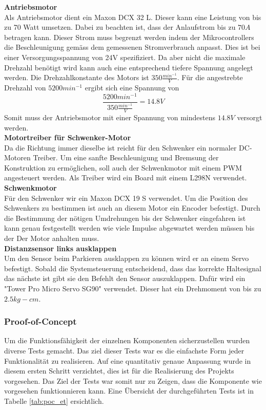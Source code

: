 \documentclass[../../main.tex]{subfiles}
\begin{document}
    \textbf{Antriebsmotor}\\
    Als Antriebsmotor dient ein Maxon DCX 32 L. Dieser kann eine Leistung von bis zu 70 Watt umsetzen. Dabei zu beachten ist, dass der Anlaufstrom bis zu $70A$ betragen kann. Dieser Strom muss begrenzt werden indem der Mikrocontrollers die Beschleunigung gemäss dem gemessenen Stromverbrauch anpasst.\cite{MaxonDCX32L} Dies ist bei einer Versorgungsspannung von 24V spezifiziert. Da aber nicht die maximale Drehzahl benötigt wird kann auch eine entsprechend tiefere Spannung angelegt werden. Die Drehzahlkonstante des Motors ist $350 \frac{min^{-1}}{V}$. Für die angestrebte Drehzahl von $5200min^{-1}$ ergibt sich eine Spannung von $$\frac{5200min^{-1}}{350 \frac{min^{-1}}{V}} =14.8V$$ Somit muss der Antriebsmotor mit einer Spannung von mindestens $14.8V$ versorgt werden.\\

    \textbf{Motortreiber für Schwenker-Motor}\\
    Da die Richtung immer dieselbe ist reicht für den Schwenker ein normaler DC-Motoren Treiber. Um eine sanfte Beschleunigung und Bremsung der Konstruktion zu ermöglichen, soll auch der Schwenkmotor mit einem PWM angesteuert werden. Als Treiber wird ein Board mit einem L298N verwendet.\\

    \textbf{Schwenkmotor}\\
    Für den Schwenker wir ein Maxon DCX 19 S verwendet. Um die Position des Schwenkers zu bestimmen ist auch an diesem Motor ein Encoder befestigt. Durch die Bestimmung der nötigen Umdrehungen bis der Schwenker eingefahren ist kann genau festgestellt werden wie viele Impulse abgewartet werden müssen bis der Der Motor anhalten muss. \cite{MaxonDCX19S}\\

    \textbf{Distanzsensor links ausklappen}\\
    Um den Sensor beim Parkieren ausklappen zu können wird er an einem Servo befestigt. Sobald die Systemsteuerung entscheidend, dass das korrekte Haltesignal das nächste ist gibt sie den Befehlt den Sensor auszuklappen. Dafür wird ein "Tower Pro Micro Servo SG90" verwendet. Dieser hat ein Drehmoment von bis zu $2.5 kg-cm$. \cite{SG90Datasheet}\\

    \subsubsection{Proof-of-Concept}
    Um die Funktionsfähigkeit der einzelnen Komponenten sicherzustellen wurden diverse Tests gemacht. Das ziel dieser Tests war es die einfachste Form jeder Funktionalität zu realisieren. Auf eine quantitativ genaue Anpassung wurde in diesem ersten Schritt verzichtet, dies ist für die Realisierung des Projekts vorgesehen. Das Ziel der Tests war somit nur zu Zeigen, dass die Komponente wie vorgesehen funktionnieren kann. Eine Übersicht der durchgeführten Tests ist in Tabelle \ref{tab:poc_et} ersichtlich.\\
\end{document}
